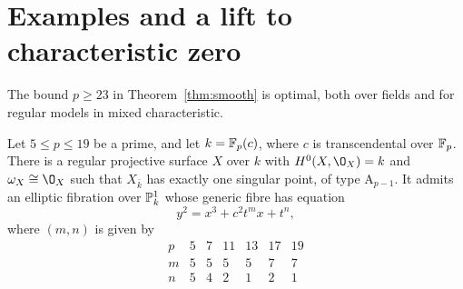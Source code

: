 \section{Examples and a lift to characteristic zero}\label{sec:sharpness}
The bound $p\geq 23$ in Theorem~\ref{thm:smooth} is optimal, both over fields and for regular models in mixed characteristic.

\begin{example}\label{ex:small-primes}\label{ex:p19}
Let $5\leq p\leq 19$ be a prime, and let $k = \mathbb{F}_p(c)$, where $c$ is transcendental over $\mathbb{F}_p$.
There is a regular projective surface $X$ over $k$ with $H^0(X,\O_X) = k$ and $\omega_X\cong\O_X$ such that $X_{\bar k}$ has exactly one singular point, of type $\mathrm A_{p-1}$.
It admits an elliptic fibration over $\mathbb{P}^1_k$ whose generic fibre has equation
\begin{equation}\label{eq:small-primes}
  y^2 = x^3+c^2t^mx+t^n,
\end{equation}
where $(m,n)$ is given by
\[
\begin{array}{c|cccccc}
p & 5 & 7 & 11 & 13 & 17 & 19\\ \hline
m & 5 & 5 & 5 & 5 & 7 & 7\\
n & 5 & 4 & 2 & 1 & 2 & 1
\end{array}
\]
\end{example}


